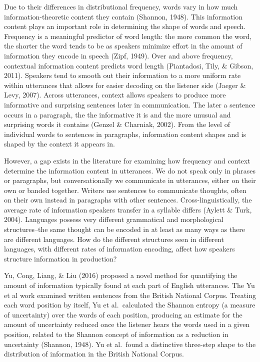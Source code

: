 \documentclass[11pt,]{article}
\begin{document}
Due to their differences in distributional frequency, words vary in how much information-theoretic content they contain (Shannon, 1948). This information content plays an important role in determining the shape of words and speech. Frequency is a meaningful predictor of word length: the more common the word, the shorter the word tends to be as speakers minimize effort in the amount of information they encode in speech (Zipf, 1949). Over and above frequency, contextual information content predicts word length (Piantadosi, Tily, \& Gibson, 2011). Speakers tend to smooth out their information to a more uniform rate within utterances that allows for easier decoding on the listener side (Jaeger \& Levy, 2007). Across utterances, context allows speakers to produce more informative and surprising sentences later in communication. The later a sentence occurs in a paragraph, the the informative it is and the more unusual and surprising words it contains (Genzel \& Charniak, 2002). From the level of individual words to sentences in paragraphs, information content shapes and is shaped by the context it appears in.

However, a gap exists in the literature for examining how frequency and context determine the information content in utterances. We do not speak only in phrases or paragraphs, but conversationally we communicate in utterances, either on their own or banded together. Writers use sentences to communicate thoughts, often on their own instead in paragraphs with other sentences. Cross-linguistically, the average rate of information speakers transfer in a syllable differs (Aylett \& Turk, 2004). Languages possess very different grammatical and morphological structures--the same thought can be encoded in at least as many ways as there are different languages. How do the different structures seen in different languages, with different rates of information encoding, affect how speakers structure information in production?

Yu, Cong, Liang, \& Liu (2016) proposed a novel method for quantifying the amount of information typically found at each part of English utterances. The Yu et al work examined written sentences from the British National Corpus. Treating each word position by itself, Yu et al.~calculated the Shannon entropy (a measure of uncertainty) over the words of each position, producing an estimate for the amount of uncertainty reduced once the listener hears the words used in a given position, related to the Shannon concept of information as a reduction in uncertainty (Shannon, 1948). Yu et al.~found a distinctive three-step shape to the distribution of information in the British National Corpus.
\end{document}
